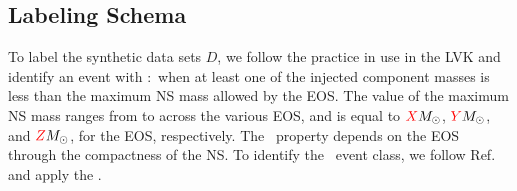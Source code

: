 \subsection*{Labeling Schema}


To label the synthetic data sets $D$, we follow the practice in use in the \ac{LVK} and identify an event with \hasns:\true\ when at least one of the injected component masses is less than the
maximum \ac{NS} mass allowed by the \ac{EOS}. The value of the maximum \ac{NS} mass ranges from  to  across the various \ac{EOS}, and is equal to
$\textcolor{red}{X}M_\odot$, $\textcolor{red}{Y}M_\odot$, and $\textcolor{red}{Z}M_\odot$, for the  \ac{EOS}, respectively. The \hasrem\ property depends on the \ac{EOS} through the
compactness of the \ac{NS}. To identify the \hasrem\ event class, we follow Ref.\ \cite{Chatterjee:2019avs} and apply the .


